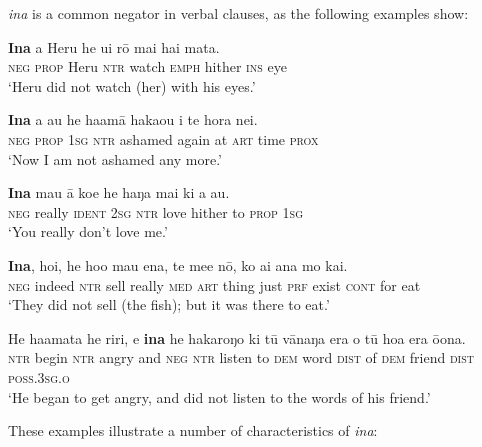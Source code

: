 \textit{{\ꞌ}ina} is a common negator in verbal clauses, as the following examples show:

\ea\label{ex:10.88}
\gll \textbf{{\ꞌ}Ina} a Heru he u{\ꞌ}i rō mai hai mata.\\
\textsc{neg} \textsc{prop} Heru \textsc{ntr} watch \textsc{emph} hither \textsc{ins} eye\\

\glt 
‘Heru did not watch (her) with his eyes.’ \textstyleExampleref{[R313.165]} 
\z

\ea\label{ex:10.89}
\gll \textbf{{\ꞌ}Ina} a au he ha{\ꞌ}amā haka{\ꞌ}ou {\ꞌ}i te hora nei. \\
\textsc{neg} \textsc{prop} \textsc{1sg} \textsc{ntr} ashamed again at \textsc{art} time \textsc{prox} \\

\glt 
‘Now I am not ashamed any more.’ \textstyleExampleref{[R334.069]} 
\z

\ea\label{ex:10.90}
\gll \textbf{{\ꞌ}Ina} mau {\ꞌ}ā koe he haŋa mai ki a au.\\
\textsc{neg} really \textsc{ident} \textsc{2sg} \textsc{ntr} love hither to \textsc{prop} \textsc{1sg}\\

\glt 
‘You really don’t love me.’ \textstyleExampleref{[R229.468]} 
\z

\ea\label{ex:10.91}
\gll \textbf{{\ꞌ}Ina}, ho{\ꞌ}i, he ho{\ꞌ}o mau ena, te me{\ꞌ}e nō, ko ai {\ꞌ}ana mo kai. \\
\textsc{neg} indeed \textsc{ntr} sell really \textsc{med} \textsc{art} thing just \textsc{prf} exist \textsc{cont} for eat \\

\glt 
‘They did not sell (the fish); but it was there to eat.’ \textstyleExampleref{[R539-1.365]}
\z

\ea\label{ex:10.92}
\gll He ha{\ꞌ}amata he riri, {\ꞌ}e \textbf{{\ꞌ}ina} he hakaroŋo ki tū vānaŋa era  o tū hoa era ō{\ꞌ}ona.\\
\textsc{ntr} begin \textsc{ntr} angry and \textsc{neg} \textsc{ntr} listen to \textsc{dem} word \textsc{dist}  of \textsc{dem} friend \textsc{dist} \textsc{poss.3sg.o}\\

\glt
‘He began to get angry, and did not listen to the words of his friend.’ \textstyleExampleref{[R237.152]} 
\z

These examples illustrate a number of characteristics of \textit{{\ꞌ}ina}:


